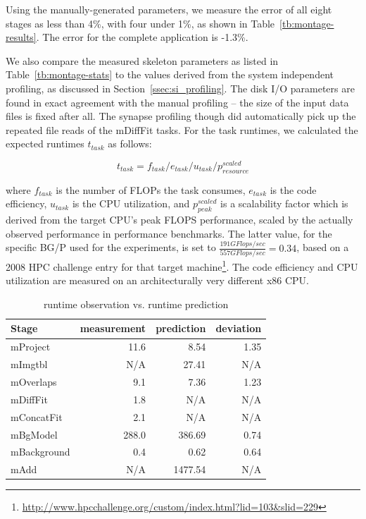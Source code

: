 \documentclass[preprint,12pt]{elsarticle}
\begin{document}
Using the manually-generated parameters, we measure the error of all eight stages as less than 4\%, with four under 1\%, as shown in Table~\ref{tb:montage-results}. The error for the complete application is -1.3\%.

We also compare the measured skeleton parameters as listed in
Table~\ref{tb:montage-stats} to the values derived from the system
independent profiling, as discussed in Section~\ref{ssec:si_profiling}. 
The disk I/O parameters are found in exact agreement with the manual
profiling -- the size of the input data files is fixed after all.
The synapse profiling though did automatically pick up the repeated file
reads of the mDiffFit tasks.  For the task runtimes, we calculated the
expected runtimes $t_{task}$ as follows:
 
$$
  t_{task} = f_{task} / e_{task} / u_{task} / p_{resource}^{scaled} 
$$

where $f_{task}$ is the number of FLOPs the task consumes, $e_{task}$
is the code efficiency, $u_{task}$ is the CPU utilization, and
$p_{peak}^{scaled}$ is a scalability factor which is derived from the
target CPU's peak FLOPS performance, scaled by the actually observed
performance in performance benchmarks.  The latter value, for the
specific BG/P used for the experiments, is set to 
$\frac{191 GFlops/sec}{557 GFlops/sec} = 0.34$,
based on a 2008 HPC challenge entry for that
target
machine\footnote{\url{http://www.hpcchallenge.org/custom/index.html?lid=103&slid=229}}.
The code efficiency and CPU utilization are measured on an
architecturally very different x86 CPU.

\begin{table}[t]
\begin{center}
    \caption{runtime observation vs. runtime prediction}
    \begin{scriptsize}
    \begin{tabular}{|l|r|r|r|}
    \hline
    Stage       & measurement & prediction &  deviation \\\hline
	mProject    &        11.6 &       8.54 &       1.35 \\ \hline
	mImgtbl     &         N/A &      27.41 &        N/A \\ \hline
	mOverlaps   &         9.1 &       7.36 &       1.23 \\ \hline
	mDiffFit    &         1.8 &        N/A &        N/A \\ \hline
	mConcatFit  &         2.1 &        N/A &        N/A \\ \hline
	mBgModel    &       288.0 &     386.69 &       0.74 \\ \hline
	mBackground &         0.4 &       0.62 &       0.64 \\ \hline
	mAdd        &         N/A &    1477.54 &        N/A \\ \hline
    \end{tabular}
    \end{scriptsize}
    \label{tb:prof-compare}
\end{center}   
\end{table}
\end{document}
